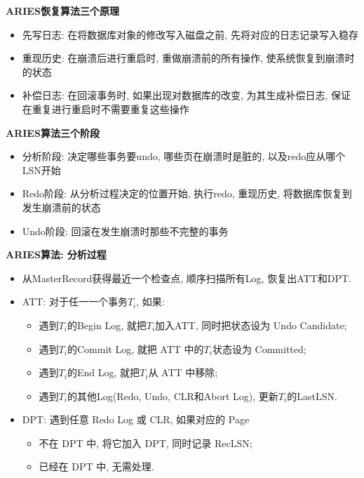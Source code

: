\textbf{ARIES恢复算法三个原理}
\begin{itemize}
    \item 先写日志: 在将数据库对象的修改写入磁盘之前, 先将对应的日志记录写入稳存
    \item 重现历史: 在崩溃后进行重启时, 重做崩溃前的所有操作, 使系统恢复到崩溃时的状态
    \item 补偿日志: 在回滚事务时, 如果出现对数据库的改变, 为其生成补偿日志, 保证在重复进行重启时不需要重复这些操作
\end{itemize}

\textbf{ARIES算法三个阶段}
\begin{itemize}
    \item 分析阶段: 决定哪些事务要undo, 哪些页在崩溃时是脏的, 以及redo应从哪个LSN开始
    \item Redo阶段: 从分析过程决定的位置开始, 执行redo, 重现历史, 将数据库恢复到发生崩溃前的状态
    \item Undo阶段: 回滚在发生崩溃时那些不完整的事务
\end{itemize}

\textbf{ARIES算法: 分析过程}
\begin{itemize}
    \item 从MasterRecord获得最近一个检查点, 顺序扫描所有Log, 恢复出ATT和DPT.
    \item ATT: 对于任一一个事务$T_i$, 如果:
    \begin{itemize}
        \item 遇到$T_i$的Begin Log, 就把$T_i$加入ATT, 同时把状态设为 Undo Candidate;
        \item 遇到$T_i$的Commit Log, 就把 ATT 中的$T_i$状态设为 Committed;
        \item 遇到$T_i$的End Log, 就把$T_i$从 ATT 中移除;
        \item 遇到$T_i$的其他Log(Redo, Undo, CLR和Abort Log), 更新$T_i$的LastLSN.
    \end{itemize}
    \item DPT: 遇到任意 Redo Log 或 CLR, 如果对应的 Page
    \begin{itemize}
        \item 不在 DPT 中, 将它加入 DPT, 同时记录 RecLSN;
        \item 已经在 DPT 中, 无需处理.
    \end{itemize}
\end{itemize}

